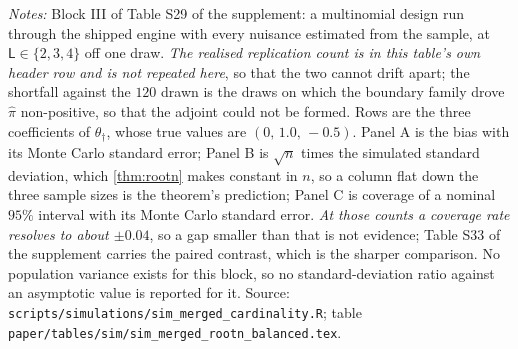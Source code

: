 \documentclass[
  12pt]{article}
\newcommand{\1}[1]{\mathds{1}\left[#1\right]}
\theoremstyle{plain}
\theoremstyle{definition}
\theoremstyle{definition}
\theoremstyle{remark}
\begin{document}
\begin{table}[p]
\centering
\begin{threeparttable}
\caption{The shipped engine at three cardinalities: the balanced design}
\label{tab:sim-merged-rootn-balanced}
\footnotesize

\begin{tablenotes}\footnotesize
\item \textit{Notes:} Block III of Table S29 of the supplement: a multinomial
design run through the shipped engine with every nuisance estimated from the
sample, at $\mathsf L\in\{2,3,4\}$ off one draw. \emph{The realised replication
count is in this table's own header row and is not repeated here}, so that the
two cannot drift apart; the shortfall against the $120$ drawn is the draws on
which the boundary family drove $\hat\pi$ non-positive, so that the adjoint could
not be formed.
Rows are the three coefficients of $\theta_\dagger$, whose true values are
$(0,\,1.0,\,-0.5)$. Panel A is the bias with its Monte Carlo standard error;
Panel B is $\sqrt n$ times the simulated standard deviation, which
\cref{thm:rootn} makes constant in $n$, so a column flat down the three sample
sizes is the theorem's prediction; Panel C is coverage of a nominal $95\%$
interval with its Monte Carlo standard error. \emph{At those counts a
coverage rate resolves to about $\pm0.04$}, so a gap smaller than that is not
evidence; Table S33 of the supplement carries the paired contrast, which is
the sharper comparison. No population variance exists for this block, so no
standard-deviation ratio against an asymptotic value is reported for it. Source:
\texttt{scripts/simulations/sim\_merged\_cardinality.R}; table
\texttt{paper/tables/sim/sim\_merged\_rootn\_balanced.tex}.
\end{tablenotes}
\end{threeparttable}
\end{table}
\end{document}
